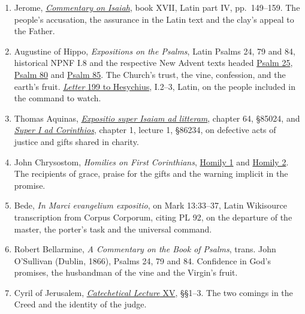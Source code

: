 \begin{enumerate}
\item Jerome, \href{https://web.archive.org/web/20240709131605id_/https://documentacatholicaomnia.eu/03d/0347-0420,_Hieronymus,_In_Isaiam_Pars_4,_LT.pdf\#page=149}{\textit{Commentary on Isaiah}}, book XVII, Latin part IV, pp.~149--159. The people's accusation, the assurance in the Latin text and the clay's appeal to the Father.
\item Augustine of Hippo, \textit{Expositions on the Psalms}, Latin Psalms 24, 79 and 84, historical NPNF I.8 and the respective New Advent texts headed \href{https://www.newadvent.org/fathers/1801025.htm}{Psalm 25}, \href{https://www.newadvent.org/fathers/1801080.htm}{Psalm 80} and \href{https://www.newadvent.org/fathers/1801085.htm}{Psalm 85}. The Church's trust, the vine, confession, and the earth's fruit. \href{https://www.augustinus.it/latino/lettere/lettera_204_testo.htm}{\textit{Letter} 199 to Hesychius}, I.2--3, Latin, on the people included in the command to watch.
\item Thomas Aquinas, \href{https://www.corpusthomisticum.org/cis50.html}{\textit{Expositio super Isaiam ad litteram}}, chapter 64, §85024, and \href{https://www.corpusthomisticum.org/c1c.html}{\textit{Super I ad Corinthios}}, chapter 1, lecture 1, §86234, on defective acts of justice and gifts shared in charity.
\item John Chrysostom, \textit{Homilies on First Corinthians}, \href{https://www.newadvent.org/fathers/220101.htm}{Homily 1} and \href{https://www.newadvent.org/fathers/220102.htm}{Homily 2}. The recipients of grace, praise for the gifts and the warning implicit in the promise.
\item Bede, \textit{In Marci evangelium expositio}, on Mark 13:33--37, Latin Wikisource transcription from Corpus Corporum, citing PL 92, on the departure of the master, the porter's task and the universal command.
\item Robert Bellarmine, \textit{A Commentary on the Book of Psalms}, trans. John O'Sullivan (Dublin, 1866), Psalms 24, 79 and 84. Confidence in God's promises, the husbandman of the vine and the Virgin's fruit.
\item Cyril of Jerusalem, \href{https://www.newadvent.org/fathers/310115.htm}{\textit{Catechetical Lecture} XV}, §§1--3. The two comings in the Creed and the identity of the judge.
\end{enumerate}
